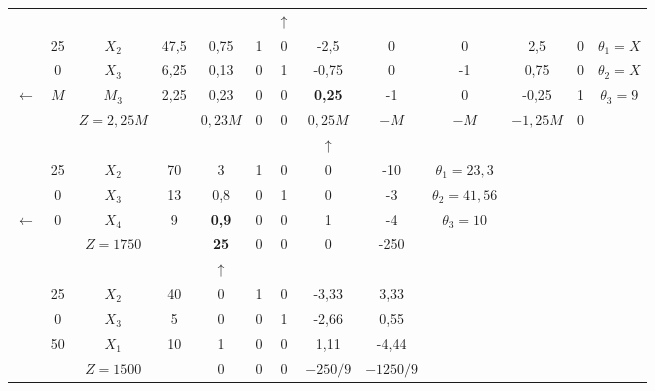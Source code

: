 \begin{tabular}{ccccccccccccc}
\cline{2-13}            &         &         &         &         &         & $\uparrow$ &         &         &         &         &         &  \bigstrut\\
\cline{2-13}            & 25      & $X_2$   & 47,5    & 0,75    & 1       & 0       & -2,5    & 0       & 0       & 2,5     & 0       & $\theta_1 = X$ \bigstrut[t]\\
            & 0       & $X_3$   & 6,25    & 0,13    & 0       & 1       & -0,75   & 0       & -1      & 0,75    & 0       & $\theta_2 = X$ \\
    $\leftarrow$ & $M$     & \textcolor[rgb]{ 1,  0,  0}{\boldmath{}\textbf{$M_3$}\unboldmath{}} & 2,25    & 0,23    & 0       & 0       & \textbf{0,25} & -1      & 0       & -0,25   & 1       & \boldmath{}\textbf{$\theta_3 = 9$}\unboldmath{} \bigstrut[b]\\
\cline{2-13}            &         & $Z=2,25  M$ &         & $0,23 M$ & 0       & 0       & \textcolor[rgb]{ 0,  .439,  .753}{\boldmath{}\textbf{$0,25 M$}\unboldmath{}} & $-M$    & $-M$    & $-1,25 M$ & 0       &  \bigstrut\\
\cline{2-13}            &         &         &         &         &         &         & $\uparrow$ &         &         &         &         &  \bigstrut\\
\cline{2-13}            & 25      & $X_2$   & 70      & 3       & 1       & 0       & 0       & -10     & $\theta_1  = 23,3$ &         &         &  \bigstrut[t]\\
            & 0       & $X_3$   & 13      & 0,8     & 0       & 1       & 0       & -3      & $\theta_2 = 41,56$ &         &         &  \\
    $\leftarrow$ & 0       & \textcolor[rgb]{ 1,  0,  0}{\boldmath{}\textbf{$X_4$}\unboldmath{}} & 9       & \textbf{0,9} & 0       & 0       & 1       & -4      & \boldmath{}\textbf{$\theta_3 = 10$}\unboldmath{} &         &         &  \bigstrut[b]\\
\cline{2-10}            &         & $Z=1750$ &         & \textcolor[rgb]{ 0,  .439,  .753}{\textbf{25}} & 0       & 0       & 0       & -250    &         &         &         &  \bigstrut\\
\cline{2-10}            &         &         &         & $\uparrow$ &         &         &         &         &         &         &         &  \bigstrut\\
\cline{2-10}            & 25      & $X_2$   & 40      & 0       & 1       & 0       & -3,33   & 3,33    &         &         &         &  \bigstrut[t]\\
            & 0       & $X_3$   & 5       & 0       & 0       & 1       & -2,66   & 0,55    &         &         &         &  \\
            & 50      & $X_1$   & 10      & 1       & 0       & 0       & 1,11    & -4,44   &         &         &         &  \bigstrut[b]\\
\cline{2-10}            &         & $Z=1500$ &         & 0       & 0       & 0       & $-250/9$ & $-1250/9$ &         &         &         &  \bigstrut\\
\cline{2-10}    \end{tabular}%
